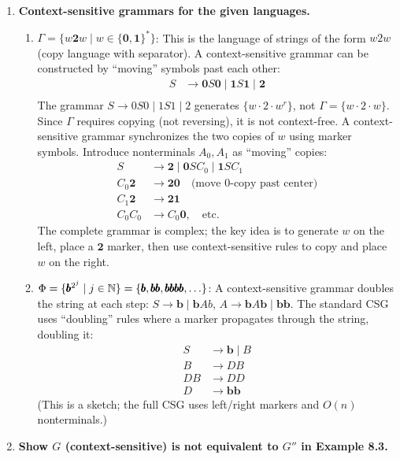 \begin{enumerate}[{8.}1. ]
\item \textbf{Context-sensitive grammars for the given languages.}

\begin{enumerate}
\item $\Gamma = \{w\pmb{2}w \mid w \in \{\pmb{0},\pmb{1}\}^*\}$:
This is the language of strings of the form $w2w$ (copy language with separator). A context-sensitive grammar can be constructed by ``moving'' symbols past each other:
\begin{align*}
S &\to \pmb{0}S\pmb{0} \mid \pmb{1}S\pmb{1} \mid \pmb{2} \\
\end{align*}
The grammar $S\to 0S0\mid 1S1\mid 2$ generates $\{w\cdot 2\cdot w^r\}$, not $\Gamma=\{w\cdot 2\cdot w\}$. Since $\Gamma$ requires copying (not reversing), it is not context-free. A context-sensitive grammar synchronizes the two copies of $w$ using marker symbols. Introduce nonterminals $A_0, A_1$ as ``moving'' copies:
\begin{align*}
S &\to \pmb{2} \mid \pmb{0}SC_0 \mid \pmb{1}SC_1 \\
C_0\pmb{2} &\to \pmb{2}\pmb{0} \quad \text{(move 0-copy past center)} \\
C_1\pmb{2} &\to \pmb{2}\pmb{1} \\
C_0C_0 &\to C_0\pmb{0}, \quad \text{etc.}
\end{align*}
The complete grammar is complex; the key idea is to generate $w$ on the left, place a $\pmb{2}$ marker, then use context-sensitive rules to copy and place $w$ on the right.

\item $\Phi = \{\pmb{b}^{2^j} \mid j \in \mathbb{N}\} = \{\pmb{b},\pmb{bb},\pmb{bbbb},\ldots\}$:
A context-sensitive grammar doubles the string at each step:
$S \to \pmb{b} \mid \pmb{b}Ab$, $A \to \pmb{b}A\pmb{b} \mid \pmb{b}\pmb{b}$.
The standard CSG uses ``doubling'' rules where a marker propagates through the string, doubling it:
\begin{align*}
S &\to \pmb{b} \mid B \\
B &\to DB \\
DB &\to DD \\
D &\to \pmb{bb}
\end{align*}
(This is a sketch; the full CSG uses left/right markers and $O(n)$ nonterminals.)
\end{enumerate}

\item \textbf{Show $G$ (context-sensitive) is not equivalent to $G''$ in Example 8.3.}


\end{enumerate}
